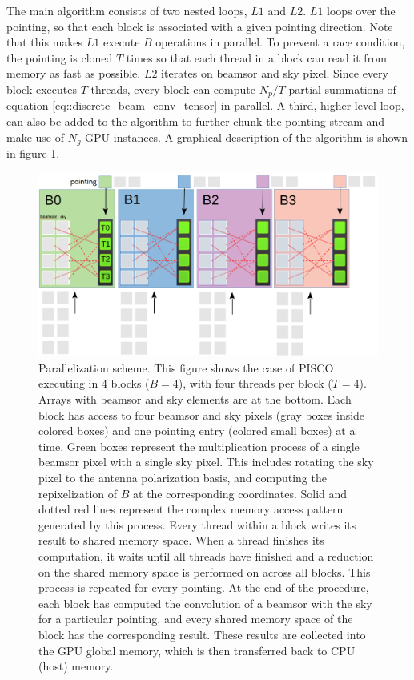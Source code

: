 \documentclass[a4paper,11pt]{article}
\begin{document}
The main algorithm consists of two nested loops, $L1$ and $L2$. $L1$ loops over the pointing, so that each block is associated with a given pointing direction. Note that this makes $L1$ execute $B$ operations in parallel. To prevent a race condition, the pointing is cloned $T$ times so that each thread in a block can read it from memory as fast as possible. $L2$ iterates on beamsor and sky pixel. Since every block executes $T$ threads, every block can compute $N_p/T$ partial summations of equation \ref{eq::discrete_beam_conv_tensor} in parallel. A third, higher level loop, can also be added to the algorithm to further chunk the pointing stream and make use of $N_g$ GPU instances. A graphical description of the algorithm is shown in figure \ref{fig::pisco_diagram}.

\begin{figure}
	\begin{center}
		\includegraphics[width=0.8\linewidth]{figures/PISCO-diagram.png}
		\caption{Parallelization scheme. This figure shows the case of PISCO executing in 4 blocks ($B=4$), with four threads per block ($T=4$). Arrays with beamsor and sky elements are at the bottom. Each block has access to four beamsor and sky pixels (gray boxes inside colored boxes) and one pointing entry (colored small boxes) at a time. Green boxes represent the multiplication process of a single beamsor pixel with a single sky pixel. This includes rotating the sky pixel to the antenna polarization basis, and computing the repixelization of $B$ at the corresponding coordinates. Solid and dotted red lines represent the complex memory access pattern generated by this process. Every thread within a block writes its result to shared memory space. When a thread finishes its computation, it waits until all threads have finished and a reduction on the shared memory space is performed on across all blocks. This process is repeated for every pointing. At the end of the procedure, each block has computed the convolution of a beamsor with the sky for a particular pointing, and every shared memory space of the block has the corresponding result. These results are collected into the GPU global memory, which is then transferred back to CPU (host) memory.}
		\label{fig::pisco_diagram}
	\end{center}
\end{figure}
\end{document}
